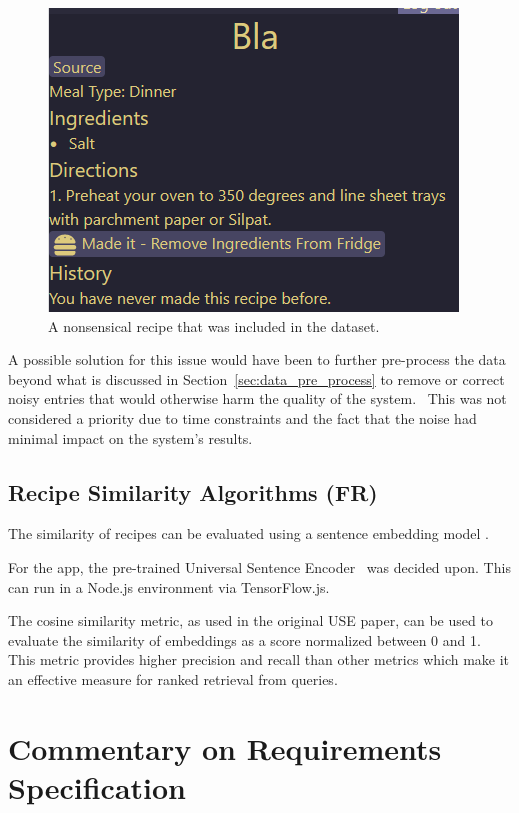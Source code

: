 \begin{figure}[p]
    \centering
    \caption{\label{fig:bad_recipe_entry}A nonsensical recipe that was included in the dataset.}
    \includegraphics[scale=0.75]{figures/bad_recipe_entry.png}
\end{figure}

A possible solution for this issue would have been to further pre-process the data beyond what is
discussed in Section~\ref{sec:data_pre_process} to remove or correct noisy entries that would otherwise
harm the quality of the system.~\cite{garcia_big_2016} This was not considered a priority due to time
constraints and the fact that the noise had minimal impact on the system's results.

\subsection{Recipe Similarity Algorithms (FR)}\label{sec:recipe_similarity}
The similarity of recipes can be evaluated using a sentence embedding model .

For the \chef{} app, the pre-trained Universal Sentence Encoder~\cite{cer_universal_2018} was decided upon.
This can run in a Node.js environment via TensorFlow.js.

The cosine similarity metric, as used in the original USE paper, can be used to evaluate the similarity of
embeddings as a score normalized between 0 and 1. This metric provides higher precision and
recall than other metrics which make it an effective measure for ranked retrieval from
queries.~\cite{ihajeer_comparison_2012}

\section{Commentary on Requirements Specification}

